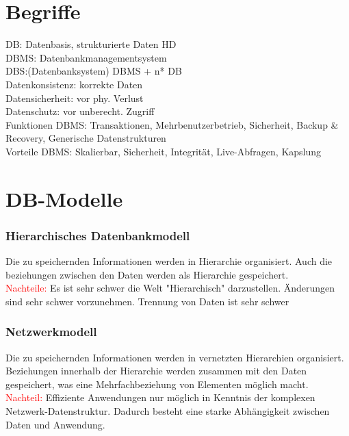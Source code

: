 \documentclass[10pt,landscape,a4paper]{scrartcl}
\begin{document}


	\begin{multicols*}{5}
		\setlength{\columnseprule}{0.4pt}
		\footnotesize
\section{Begriffe}
\textcolor{b}{DB:} Datenbasis, strukturierte Daten HD\\
\textcolor{b}{DBMS:} Datenbankmanagementsystem\\
\textcolor{b}{DBS:}(Datenbanksystem) DBMS + n* DB\\
\textcolor{b}{Datenkonsistenz:} korrekte Daten\\
\textcolor{b}{Datensicherheit:} vor phy. Verlust\\
\textcolor{b}{Datenschutz:} vor unberecht. Zugriff\\
\textcolor{b}{Funktionen DBMS:} Transaktionen, Mehrbenutzerbetrieb, Sicherheit, Backup \& Recovery, Generische Datenstrukturen\\
\textcolor{b}{Vorteile DBMS:} Skalierbar, Sicherheit, Integrität, Live-Abfragen, Kapslung\\



\section{DB-Modelle}
\subsubsection{Hierarchisches Datenbankmodell}
Die zu speichernden Informationen werden in \textcolor{b}{Hierarchie} organisiert. Auch die beziehungen zwischen den Daten werden als Hierarchie gespeichert.\\
\textcolor{red}{Nachteile:} Es ist sehr schwer die Welt "Hierarchisch" darzustellen. Änderungen sind sehr schwer vorzunehmen. Trennung von Daten ist sehr schwer
\subsubsection{Netzwerkmodell}
Die zu speichernden Informationen werden in vernetzten Hierarchien	organisiert. Beziehungen innerhalb der Hierarchie werden zusammen mit den Daten gespeichert, was eine \textcolor{b}{Mehrfachbeziehung} von Elementen möglich macht.\\
\textcolor{red}{Nachteil:} Effiziente Anwendungen nur möglich in Kenntnis der komplexen Netzwerk-Datenstruktur. Dadurch besteht eine starke Abhängigkeit zwischen Daten und Anwendung.

\end{multicols*}
\end{document}
